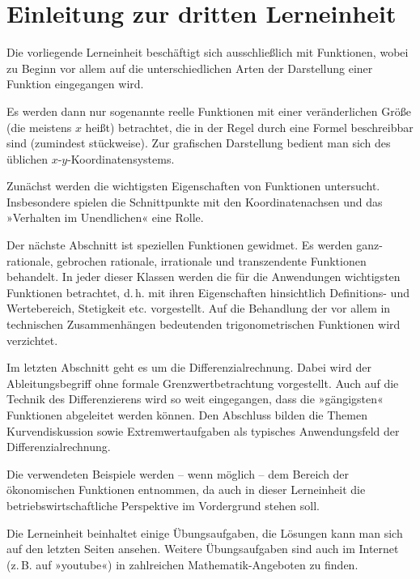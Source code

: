 \chapter*{Einleitung zur dritten Lerneinheit}

Die vorliegende Lerneinheit beschäftigt sich ausschließlich mit Funktionen, wobei zu Beginn vor allem auf die unterschiedlichen Arten der Darstellung einer Funktion eingegangen wird.

Es werden dann nur sogenannte reelle Funktionen mit einer veränderlichen Größe (die meistens $x$ heißt) betrachtet, die in der Regel durch eine Formel beschreibbar sind (zumindest stückweise). Zur grafischen Darstellung bedient man sich des üblichen $x$-$y$-Koordinatensystems.

Zunächst werden die wichtigsten Eigenschaften von Funktionen untersucht. Insbesondere spielen die Schnittpunkte mit den Koordinatenachsen und das »Verhalten im Unendlichen« eine Rolle.

Der nächste Abschnitt ist speziellen Funktionen gewidmet. Es werden ganz-rationale, gebrochen rationale, irrationale und transzendente Funktionen behandelt. In jeder dieser Klassen werden die für die Anwendungen wichtigsten Funktionen betrachtet, d.\,h. mit ihren Eigenschaften hinsichtlich Definitions- und Wertebereich, Stetigkeit etc. vorgestellt. Auf die Behandlung der vor allem in technischen Zusammenhängen bedeutenden trigonometrischen Funktionen wird verzichtet.

Im letzten Abschnitt geht es um die Differenzialrechnung. Dabei wird der Ableitungsbegriff ohne formale Grenzwertbetrachtung vorgestellt. Auch auf die Technik des Differenzierens wird so weit eingegangen, dass die »gängigsten« Funktionen abgeleitet werden können. Den Abschluss bilden die Themen Kurvendiskussion sowie Extremwertaufgaben als typisches Anwendungsfeld der Differenzialrechnung.

Die verwendeten Beispiele werden -- wenn möglich -- dem Bereich der ökonomischen Funktionen entnommen, da auch in dieser Lerneinheit die betriebswirtschaftliche Perspektive im Vordergrund stehen soll.

Die Lerneinheit beinhaltet einige Übungsaufgaben, die Lösungen kann man sich auf den letzten Seiten ansehen. Weitere Übungsaufgaben sind auch im Internet (z.\,B. auf »youtube«) in zahlreichen Mathematik-Angeboten zu finden.
